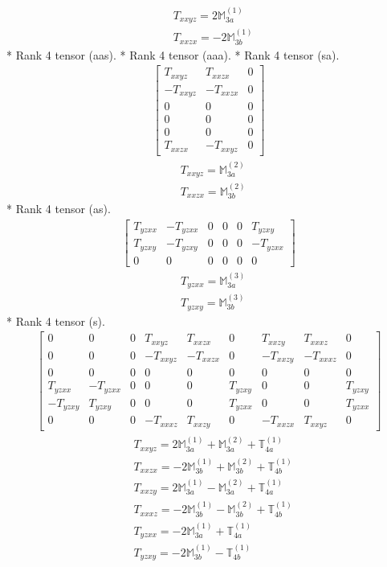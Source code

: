 \documentclass[fleqn,8pt,landscape]{jsarticle}
\begin{document}
\begin{align*}
& T_{xxyz} = 2 \mathbb{M}_{3a}^{(1)} \\
& T_{xxzx} = - 2 \mathbb{M}_{3b}^{(1)}
\end{align*}
* Rank 4 tensor (aas).
* Rank 4 tensor (aaa).
* Rank 4 tensor (sa).
\begin{align*}
\begin{bmatrix} T_{xxyz} & T_{xxzx} & 0 \\ - T_{xxyz} & - T_{xxzx} & 0 \\ 0 & 0 & 0 \\ 0 & 0 & 0 \\ 0 & 0 & 0 \\ T_{xxzx} & - T_{xxyz} & 0 \end{bmatrix}
\end{align*}
\begin{align*}
& T_{xxyz} = \mathbb{M}_{3a}^{(2)} \\
& T_{xxzx} = \mathbb{M}_{3b}^{(2)}
\end{align*}
* Rank 4 tensor (as).
\begin{align*}
\begin{bmatrix} T_{yzxx} & - T_{yzxx} & 0 & 0 & 0 & T_{yzxy} \\ T_{yzxy} & - T_{yzxy} & 0 & 0 & 0 & - T_{yzxx} \\ 0 & 0 & 0 & 0 & 0 & 0 \end{bmatrix}
\end{align*}
\begin{align*}
& T_{yzxx} = \mathbb{M}_{3a}^{(3)} \\
& T_{yzxy} = \mathbb{M}_{3b}^{(3)}
\end{align*}
* Rank 4 tensor (s).
\begin{align*}
\begin{bmatrix} 0 & 0 & 0 & T_{xxyz} & T_{xxzx} & 0 & T_{xxzy} & T_{xxxz} & 0 \\ 0 & 0 & 0 & - T_{xxyz} & - T_{xxzx} & 0 & - T_{xxzy} & - T_{xxxz} & 0 \\ 0 & 0 & 0 & 0 & 0 & 0 & 0 & 0 & 0 \\ T_{yzxx} & - T_{yzxx} & 0 & 0 & 0 & T_{yzxy} & 0 & 0 & T_{yzxy} \\ - T_{yzxy} & T_{yzxy} & 0 & 0 & 0 & T_{yzxx} & 0 & 0 & T_{yzxx} \\ 0 & 0 & 0 & - T_{xxxz} & T_{xxzy} & 0 & - T_{xxzx} & T_{xxyz} & 0 \end{bmatrix}
\end{align*}
\begin{align*}
& T_{xxyz} = 2 \mathbb{M}_{3a}^{(1)} + \mathbb{M}_{3a}^{(2)} + \mathbb{T}_{4a}^{(1)} \\
& T_{xxzx} = - 2 \mathbb{M}_{3b}^{(1)} + \mathbb{M}_{3b}^{(2)} + \mathbb{T}_{4b}^{(1)} \\
& T_{xxzy} = 2 \mathbb{M}_{3a}^{(1)} - \mathbb{M}_{3a}^{(2)} + \mathbb{T}_{4a}^{(1)} \\
& T_{xxxz} = - 2 \mathbb{M}_{3b}^{(1)} - \mathbb{M}_{3b}^{(2)} + \mathbb{T}_{4b}^{(1)} \\
& T_{yzxx} = - 2 \mathbb{M}_{3a}^{(1)} + \mathbb{T}_{4a}^{(1)} \\
& T_{yzxy} = - 2 \mathbb{M}_{3b}^{(1)} - \mathbb{T}_{4b}^{(1)}
\end{align*}
\end{document}
